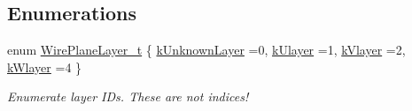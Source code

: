 \subsection*{Enumerations}
\begin{DoxyCompactItemize}
\item 
enum \hyperlink{namespace_wire_cell_a761397ff086f0a7e1a1d9ccd251ac618}{Wire\+Plane\+Layer\+\_\+t} \{ \hyperlink{namespace_wire_cell_a761397ff086f0a7e1a1d9ccd251ac618a5e08d3f7bdabe20d6e2f00bc353beff9}{k\+Unknown\+Layer} =0, 
\hyperlink{namespace_wire_cell_a761397ff086f0a7e1a1d9ccd251ac618a4543784e91b7463d50a413e9eaea3229}{k\+Ulayer} =1, 
\hyperlink{namespace_wire_cell_a761397ff086f0a7e1a1d9ccd251ac618ad767a06a96af29d2fd31cbf13f4a1c86}{k\+Vlayer} =2, 
\hyperlink{namespace_wire_cell_a761397ff086f0a7e1a1d9ccd251ac618ac96acb93802a30ef1648ee1c0e81eab1}{k\+Wlayer} =4
 \}\begin{DoxyCompactList}\small\item\em Enumerate layer I\+Ds. These are not indices! \end{DoxyCompactList}
\end{DoxyCompactItemize}
